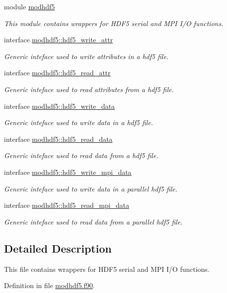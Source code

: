 \begin{DoxyCompactItemize}
\item 
module \hyperlink{classmodhdf5}{modhdf5}
\begin{DoxyCompactList}\small\item\em This module contains wrappers for H\-D\-F5 serial and M\-P\-I I/\-O functions. \end{DoxyCompactList}\item 
interface \hyperlink{interfacemodhdf5_1_1hdf5__write__attr}{modhdf5\-::hdf5\-\_\-write\-\_\-attr}
\begin{DoxyCompactList}\small\item\em Generic inteface used to write attributes in a hdf5 file. \end{DoxyCompactList}\item 
interface \hyperlink{interfacemodhdf5_1_1hdf5__read__attr}{modhdf5\-::hdf5\-\_\-read\-\_\-attr}
\begin{DoxyCompactList}\small\item\em Generic inteface used to read attributes from a hdf5 file. \end{DoxyCompactList}\item 
interface \hyperlink{interfacemodhdf5_1_1hdf5__write__data}{modhdf5\-::hdf5\-\_\-write\-\_\-data}
\begin{DoxyCompactList}\small\item\em Generic inteface used to write data in a hdf5 file. \end{DoxyCompactList}\item 
interface \hyperlink{interfacemodhdf5_1_1hdf5__read__data}{modhdf5\-::hdf5\-\_\-read\-\_\-data}
\begin{DoxyCompactList}\small\item\em Generic inteface used to read data from a hdf5 file. \end{DoxyCompactList}\item 
interface \hyperlink{interfacemodhdf5_1_1hdf5__write__mpi__data}{modhdf5\-::hdf5\-\_\-write\-\_\-mpi\-\_\-data}
\begin{DoxyCompactList}\small\item\em Generic inteface used to write data in a parallel hdf5 file. \end{DoxyCompactList}\item 
interface \hyperlink{interfacemodhdf5_1_1hdf5__read__mpi__data}{modhdf5\-::hdf5\-\_\-read\-\_\-mpi\-\_\-data}
\begin{DoxyCompactList}\small\item\em Generic inteface used to read data from a parallel hdf5 file. \end{DoxyCompactList}\end{DoxyCompactItemize}


\subsection{Detailed Description}
This file contains wrappers for H\-D\-F5 serial and M\-P\-I I/\-O functions. 

Definition in file \hyperlink{modhdf5_8f90_source}{modhdf5.\-f90}.

